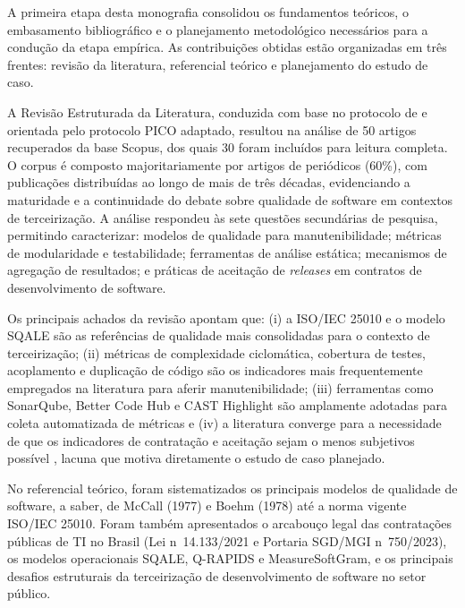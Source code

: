A primeira etapa desta monografia consolidou os fundamentos teóricos, o embasamento bibliográfico e o planejamento metodológico necessários para a condução da etapa empírica. As contribuições obtidas estão organizadas em três frentes: revisão da literatura, referencial teórico e planejamento do estudo de caso.

A Revisão Estruturada da Literatura, conduzida com base no protocolo de  e orientada pelo protocolo PICO adaptado, resultou na análise de 50 artigos recuperados da base Scopus, dos quais 30 foram incluídos para leitura completa. O corpus é composto majoritariamente por artigos de periódicos (60\%), com publicações distribuídas ao longo de mais de três décadas, evidenciando a maturidade e a continuidade do debate sobre qualidade de software em contextos de terceirização. A análise respondeu às sete questões secundárias de pesquisa, permitindo caracterizar: modelos de qualidade para manutenibilidade; métricas de modularidade e testabilidade; ferramentas de análise estática; mecanismos de agregação de resultados; e práticas de aceitação de \textit{releases} em contratos de desenvolvimento de software.

Os principais achados da revisão apontam que: (i) a ISO/IEC 25010 e o modelo SQALE são as referências de qualidade mais consolidadas para o contexto de terceirização; (ii) métricas de complexidade ciclomática, cobertura de testes, acoplamento e duplicação de código são os indicadores mais frequentemente empregados na literatura para aferir manutenibilidade; (iii) ferramentas como SonarQube, Better Code Hub e CAST Highlight são amplamente adotadas para coleta automatizada de métricas e (iv) a literatura converge para a necessidade de que os indicadores de contratação e aceitação sejam o menos subjetivos possível \cite{gorski2006evaluation}, lacuna que motiva diretamente o estudo de caso planejado.

No referencial teórico, foram sistematizados os principais modelos de qualidade de software, a saber, de McCall (1977) e Boehm (1978) até a norma vigente ISO/IEC 25010. Foram também apresentados o arcabouço legal das contratações públicas de TI no Brasil (Lei n\textordmasculine~14.133/2021 e Portaria SGD/MGI n\textordmasculine~750/2023), os modelos operacionais SQALE, Q-RAPIDS e MeasureSoftGram, e os principais desafios estruturais da terceirização de desenvolvimento de software no setor público.

